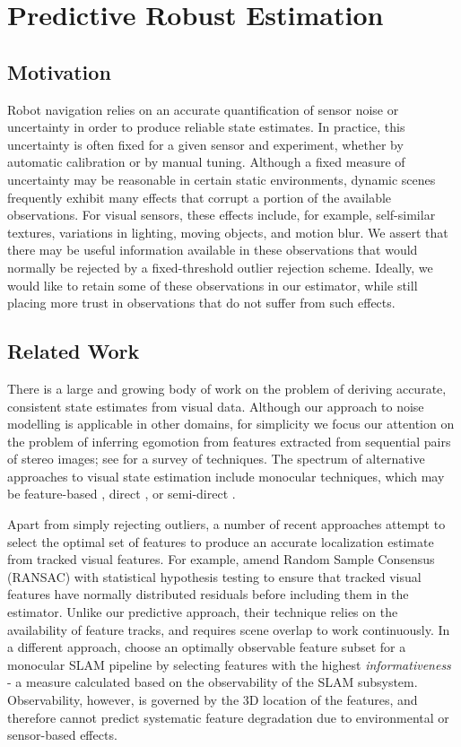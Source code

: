 \chapter{Predictive Robust Estimation}

\section{Motivation}
Robot navigation relies on an accurate quantification of sensor noise or uncertainty in order to produce reliable state estimates.
In practice, this uncertainty is often fixed for a given sensor and experiment, whether by automatic calibration or by manual tuning.
Although a fixed measure of uncertainty may be reasonable in certain static environments, dynamic scenes frequently exhibit many effects that corrupt a portion of the available observations.
For visual sensors, these effects include, for example, self-similar textures, variations in lighting, moving objects, and motion blur. 
We assert that there may be useful information available in these observations that would normally be rejected by a fixed-threshold outlier rejection scheme. 
Ideally, we would like to retain some of these observations in our estimator, while still placing more trust in observations that do not suffer from such effects.

\section{Related Work}


There is a large and growing body of work on the problem of deriving accurate,
consistent state estimates from visual data.  Although our approach to noise
modelling is applicable in other domains, for simplicity we focus our attention
on the problem of inferring egomotion from features extracted from sequential
pairs of stereo images; see \citet{sunderhauf2007stereo} for a survey of
techniques. The spectrum of alternative approaches to visual state estimation
include monocular techniques, which may be feature-based
\citep{scaramuzza2011visual}, direct \citep{irani2000direct}, or semi-direct
\citep{forster2014svo}. 

Apart from simply rejecting outliers, a number of recent approaches attempt to
select the optimal set of features to produce an accurate localization estimate
from tracked visual features. For example, \citet{Tsotsos2015} amend Random
Sample Consensus (RANSAC) with statistical hypothesis testing to ensure that tracked visual features have normally distributed residuals before including them in
the estimator. Unlike our predictive approach, their technique relies on the availability of feature tracks, and requires scene overlap to work continuously. In a different
approach,  choose an optimally observable feature subset for a
monocular SLAM pipeline by selecting features with the highest \textit{informativeness} - a measure calculated based on the observability of the SLAM subsystem. Observability, however, is governed by the 3D location of the features, and therefore cannot predict systematic feature degradation due to environmental or sensor-based effects. 

